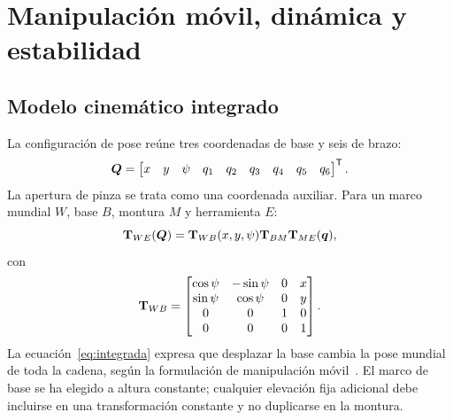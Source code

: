 \chapter{Manipulación móvil, dinámica y estabilidad}
\label{cap:dinamica}

\section{Modelo cinemático integrado}
La configuración de pose reúne tres coordenadas de base y seis de brazo:
\begin{equation}
\boldsymbol{Q}=\begin{bmatrix}x&y&\psi&q_1&q_2&q_3&q_4&q_5&q_6\end{bmatrix}^{\mathsf{T}}.
\end{equation}
La apertura de pinza se trata como una coordenada auxiliar. Para un marco mundial $W$, base $B$, montura $M$ y herramienta $E$:
\begin{equation}
\mathbf{T}_{WE}(\boldsymbol{Q})=\mathbf{T}_{WB}(x,y,\psi)\mathbf{T}_{BM}\mathbf{T}_{ME}(\boldsymbol{q}),
\label{eq:integrada}
\end{equation}
con
\begin{equation}
\mathbf{T}_{WB}=\begin{bmatrix}
\cos\psi&-\sin\psi&0&x\\\sin\psi&\cos\psi&0&y\\0&0&1&0\\0&0&0&1
\end{bmatrix}.
\end{equation}
La ecuación~\eqref{eq:integrada} expresa que desplazar la base cambia la pose mundial de toda la cadena, según la formulación de manipulación móvil~\cite{mobile}. El marco de base se ha elegido a altura constante; cualquier elevación fija adicional debe incluirse en una transformación constante y no duplicarse en la montura.

